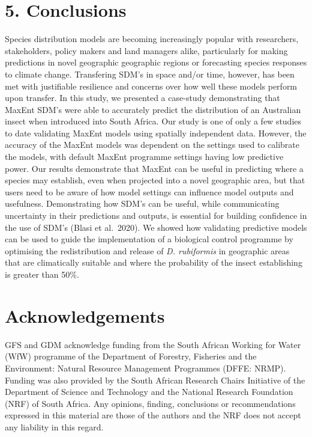 \documentclass[12pt,]{article}
\begin{document}
\hypertarget{conclusions}{%
\section{5. Conclusions}\label{conclusions}}

Species distribution models are becoming increasingly popular with
researchers, stakeholders, policy makers and land managers alike,
particularly for making predictions in novel geographic geographic
regions or forecasting species responses to climate change. Transfering
SDM's in space and/or time, however, has been met with justifiable
resilience and concerns over how well these models perform upon
transfer. In this study, we presented a case-study demonstrating that
MaxEnt SDM's were able to accurately predict the distribution of an
Australian insect when introduced into South Africa. Our study is one of
only a few studies to date validating MaxEnt models using spatially
independent data. However, the accuracy of the MaxEnt models was
dependent on the settings used to calibrate the models, with default
MaxEnt programme settings having low predictive power. Our results
demonstrate that MaxEnt can be useful in predicting where a species may
establish, even when projected into a novel geographic area, but that
users need to be aware of how model settings can influence model outputs
and usefulness. Demonstrating how SDM's can be useful, while
communicating uncertainty in their predictions and outputs, is essential
for building confidence in the use of SDM's (Blasi et al.~2020). We
showed how validating predictive models can be used to guide the
implementation of a biological control programme by optimising the
redistribution and release of \emph{D. rubiformis} in geographic areas
that are climatically suitable and where the probability of the insect
establishing is greater than 50\%.

\hypertarget{acknowledgements}{%
\section{Acknowledgements}\label{acknowledgements}}

GFS and GDM acknowledge funding from the South African Working for Water
(WfW) programme of the Department of Forestry, Fisheries and the
Environment: Natural Resource Management Programmes (DFFE: NRMP).
Funding was also provided by the South African Research Chairs
Initiative of the Department of Science and Technology and the National
Research Foundation (NRF) of South Africa. Any opinions, finding,
conclusions or recommendations expressed in this material are those of
the authors and the NRF does not accept any liability in this regard.
\end{document}
